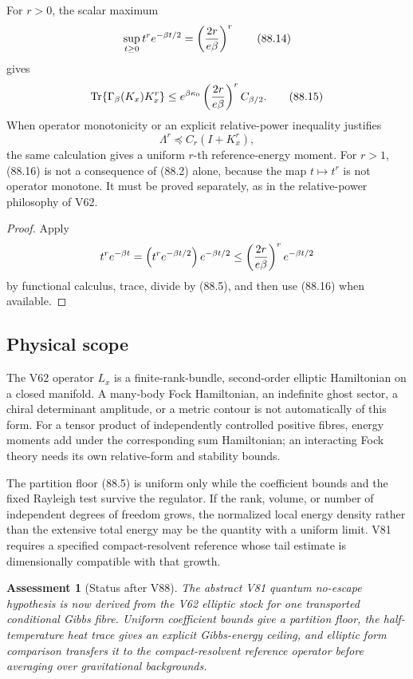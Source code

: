 \documentclass[11pt]{article}
\newtheorem{assessment}[theorem]{Assessment}
\theoremstyle{remark}
\begin{document}
For \(r>0\), the scalar maximum
\[
 \sup_{t\geq0}t^re^{-\beta t/2}
 =\left({2r\over e\beta}\right)^r                            \tag{88.14}
\]
gives
\begin{equation}
 \operatorname{Tr}\{\Gamma_\beta(K_x)K_x^r\}
 \leq
 e^{\beta\kappa_0}
 \left({2r\over e\beta}\right)^r C_{\beta/2}.                \tag{88.15}
\end{equation}
When operator monotonicity or an explicit relative-power inequality
justifies
\begin{equation}
                         \Lambda^r\preceq C_r(I+K_x^r),      \tag{88.16}
\end{equation}
the same calculation gives a uniform \(r\)-th reference-energy
moment.  For \(r>1\), (88.16) is not a consequence of (88.2) alone,
because the map \(t\mapsto t^r\) is not operator monotone.  It must be
proved separately, as in the relative-power philosophy of V62.

\begin{proof}
Apply
\[
 t^re^{-\beta t}
 =\left(t^re^{-\beta t/2}\right)e^{-\beta t/2}
 \leq\left({2r\over e\beta}\right)^re^{-\beta t/2}
\]
by functional calculus, trace, divide by (88.5), and then use
(88.16) when available.
\end{proof}

\subsection{Physical scope}

The V62 operator \(L_x\) is a finite-rank-bundle, second-order
elliptic Hamiltonian on a closed manifold.  A many-body Fock
Hamiltonian, an indefinite ghost sector, a chiral determinant
amplitude, or a metric contour is not automatically of this form.
For a tensor product of independently controlled positive fibres,
energy moments add under the corresponding sum Hamiltonian; an
interacting Fock theory needs its own relative-form and stability
bounds.

The partition floor (88.5) is uniform only while the coefficient
bounds and the fixed Rayleigh test survive the regulator.  If the
rank, volume, or number of independent degrees of freedom grows,
the normalized local energy density rather than the extensive total
energy may be the quantity with a uniform limit.  V81 requires a
specified compact-resolvent reference whose tail estimate is
dimensionally compatible with that growth.

\begin{assessment}[Status after V88]
\label{ass:v12v88-status}
The abstract V81 quantum no-escape hypothesis is now derived from the
V62 elliptic stock for one transported conditional Gibbs fibre.
Uniform coefficient bounds give a partition floor, the
half-temperature heat trace gives an explicit Gibbs-energy ceiling,
and elliptic form comparison transfers it to the compact-resolvent
reference operator before averaging over gravitational backgrounds.
\end{assessment}
\end{document}
